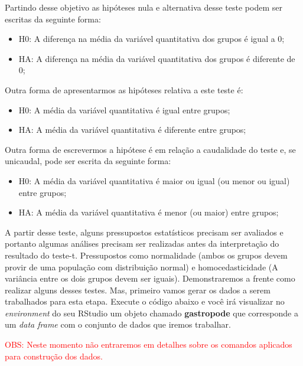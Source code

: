 \documentclass[14pt,titlepage, oneside, openany, a4paper]{book}
\providecommand{\tightlist}{%
  \setlength{\itemsep}{0pt}\setlength{\parskip}{0pt}}
\begin{document}
Partindo desse objetivo as hipóteses nula e alternativa desse teste podem ser escritas da seguinte forma:

\begin{itemize}
\tightlist
\item
  H0: A diferença na média da variável quantitativa dos grupos é igual a 0;
\item
  HA: A diferença na média da variável quantitativa dos grupos é diferente de 0;
\end{itemize}

Outra forma de apresentarmos as hipóteses relativa a este teste é:

\begin{itemize}
\tightlist
\item
  H0: A média da variável quantitativa é igual entre grupos;
\item
  HA: A média da variável quantitativa é diferente entre grupos;
\end{itemize}

Outra forma de escrevermos a hipótese é em relação a caudalidade do teste e, se unicaudal, pode ser escrita da seguinte forma:

\begin{itemize}
\tightlist
\item
  H0: A média da variável quantitativa é maior ou igual (ou menor ou igual) entre grupos;
\item
  HA: A média da variável quantitativa é menor (ou maior) entre grupos;
\end{itemize}

A partir desse teste, alguns pressupostos estatísticos precisam ser avaliados e portanto algumas análises precisam ser realizadas antes da interpretação do resultado do teste-t. Pressupostos como normalidade (ambos os grupos devem provir de uma população com distribuição normal) e homocedasticidade (A variância entre os dois grupos devem ser iguais). Demonstraremos a frente como realizar alguns desses testes. Mas, primeiro vamos gerar os dados a serem trabalhados para esta etapa. Execute o código abaixo e você irá visualizar no \emph{environment} do seu RStudio um objeto chamado \textbf{gastropode} que corresponde a um \emph{data frame} com o conjunto de dados que iremos trabalhar.

\textcolor{red}{OBS: Neste momento não entraremos em detalhes sobre os comandos aplicados para construção dos dados.}
\end{document}
